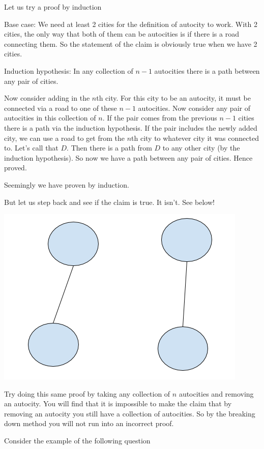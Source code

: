 \documentclass[12pt]{article}
\begin{document}
Let us try a proof by induction

Base case: We need at least 2 cities for the definition of autocity to work. With 2 cities, the only way that both of them can be autocities is if there is a road connecting them. So the statement of the claim is obviously true when we have 2 cities.

Induction hypothesis: In any collection of $n-1$ autocities there is a path between any pair of cities.

Now consider adding in the $n$th city. For this city to be an autocity, it must be connected via a road to one of these $n-1$ autocities. Now consider any pair of autocities in this collection of $n$. If the pair comes from the previous $n-1$ cities there is a path via the induction hypothesis. If the pair includes the newly added city, we can use a road to get from the $n$th city to whatever city it was connected to. Let's call that $D$. Then there is a path from $D$ to any other city (by the induction hypothesis). So now we have a path between any pair of cities. Hence proved.

Seemingly we have proven by induction.

But let us step back and see if the claim is true. It isn't. See below!

\includegraphics[scale=0.5]{autocity.png}

Try doing this same proof by taking  any collection of $n$ autocities and removing an autocity. You will find that it is impossible to make the claim that by removing an autocity you still have a collection of autocities. So by the breaking down method you will not run into an incorrect proof.


Consider the example of the following question
\end{document}
